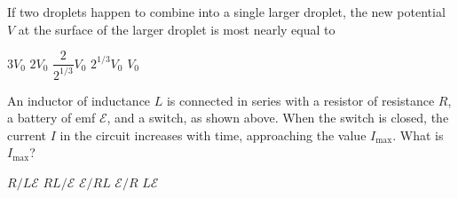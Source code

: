 \documentclass[12pt]{../oss-classkick-exam}
\begin{document}
\begin{questions}
  \question If two droplets happen to combine into a single larger droplet, the
  new potential $V$ at the surface of the larger droplet is most nearly equal to
  \label{rain2}
  \begin{choices}
    \choice $3V_0$
    \choice $2V_0$
    \choice $\dfrac2{2^{1/3}}V_0$
    \choice $2^{1/3}V_0$
    \choice $V_0$
  \end{choices}
  
%
%  
  \uplevel{ \rule{\linewidth}{.5pt}}
  
  \question An inductor of inductance $L$ is connected in series with a
  resistor of resistance $R$, a battery of emf $\mathcal E$, and a switch, as
  shown above. When the switch is closed, the current $I$ in the circuit
  increases with time, approaching the value $I_\text{max}$. What is
  $I_\text{max}$?
  
  \begin{minipage}{.4\textwidth}
  \end{minipage}
  \begin{minipage}{.4\linewidth}
    \begin{choices}
      \choice $R/L\mathcal E$
      \choice $RL/\mathcal E$
      \choice $\mathcal E/RL$
      \choice $\mathcal E/R$
      \choice $L\mathcal E$
    \end{choices}
  \end{minipage}
  \newpage  
  

\end{questions}
\end{document}

